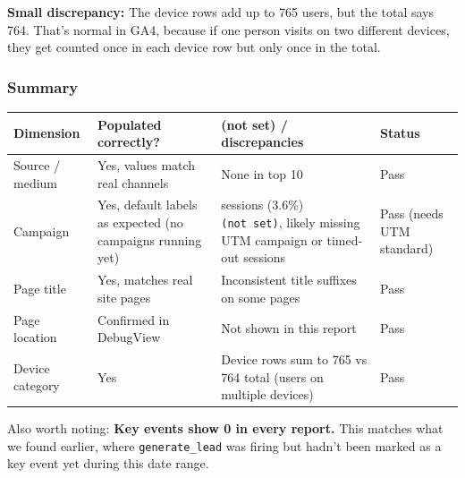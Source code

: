 \documentclass[
  letterpaper,
  DIV=11,
  numbers=noendperiod]{scrartcl}
\newcounter{none} %
\begin{document}
\textbf{Small discrepancy:} The device rows add up to 765 users, but the
total says 764. That's normal in GA4, because if one person visits on
two different devices, they get counted once in each device row but only
once in the total.

\subsubsection{Summary}\label{summary-1}

{\def\LTcaptype{none} %
\begin{longtable}[]{@{}
  >{\raggedright\arraybackslash}p{}
  >{\raggedright\arraybackslash}p{}
  >{\raggedright\arraybackslash}p{}
  >{\raggedright\arraybackslash}p{}@{}}
\toprule\noalign{}
\begin{minipage}[b]{\linewidth}\raggedright
Dimension
\end{minipage} & \begin{minipage}[b]{\linewidth}\raggedright
Populated correctly?
\end{minipage} & \begin{minipage}[b]{\linewidth}\raggedright
(not set) / discrepancies
\end{minipage} & \begin{minipage}[b]{\linewidth}\raggedright
Status
\end{minipage} \\
\midrule\noalign{}
\endhead
\bottomrule\noalign{}
\endlastfoot
Source / medium & Yes, values match real channels & None in top 10 &
Pass \\
Campaign & Yes, default labels as expected (no campaigns running yet) &
32 sessions (3.6\%) \texttt{(not\ set)}, likely missing UTM campaign or
timed-out sessions & Pass (needs UTM standard) \\
Page title & Yes, matches real site pages & Inconsistent title suffixes
on some pages & Pass \\
Page location & Confirmed in DebugView & Not shown in this report &
Pass \\
Device category & Yes & Device rows sum to 765 vs 764 total (users on
multiple devices) & Pass \\
\end{longtable}
}

Also worth noting: \textbf{Key events show 0 in every report.} This
matches what we found earlier, where \texttt{generate\_lead} was firing
but hadn't been marked as a key event yet during this date range.
\end{document}
